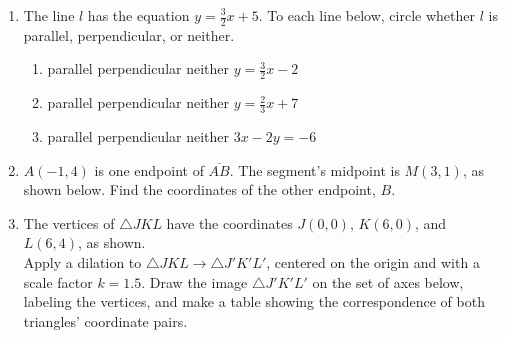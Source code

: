 \documentclass[12pt, twoside]{article}
\begin{document}
\begin{enumerate}
\item The line $l$ has the equation $y=\frac{3}{2}x+5$. To each line below, circle whether $l$ is parallel, perpendicular, or neither.
  \begin{enumerate}
    \item parallel \quad perpendicular \quad neither \qquad $y=\frac{3}{2}x-2$
    \vspace{0.5cm}
    \item parallel \quad perpendicular \quad neither \qquad $y=\frac{2}{3}x+7$
    \vspace{0.5cm}
    \item parallel \quad perpendicular \quad neither \qquad $3x-2y=-6$
    \vspace{2cm}
  \end{enumerate}

\item $A(-1,4)$ is one endpoint of $\overline{AB}$. The segment's midpoint is $M(3,1)$, as shown below. Find the coordinates of the other endpoint, $B$.
    \begin{flushright}
    \end{flushright}

\newpage
  \item The vertices of $\triangle JKL$ have the coordinates $J(0,0)$, $K(6,0)$, and $L(6,4)$, as shown. \\[0.25cm]
    Apply a dilation to $\triangle JKL \rightarrow \triangle J'K'L'$, centered on the origin and with a scale factor $k=1.5$. Draw the image $\triangle J'K'L'$ on the set of axes below, labeling the vertices, and make a table showing the correspondence of both triangles' coordinate pairs.
      \begin{flushright}
      \end{flushright}


\end{enumerate}
\end{document}
